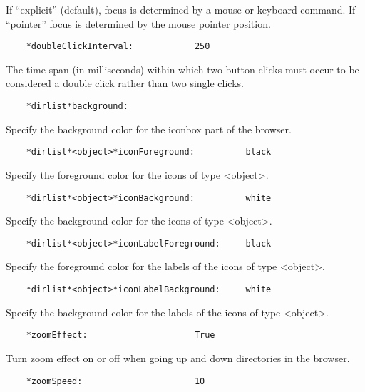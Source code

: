    If ``explicit'' (default), focus is determined by a mouse or keyboard
   command. If ``pointer'' focus is determined by the mouse pointer position.

\begin{verbatim}
    *doubleClickInterval:            250
\end{verbatim}

   The time span (in milliseconds) within which two button clicks must occur
   to be considered a double click rather than two single clicks.

\begin{verbatim}
    *dirlist*background:
\end{verbatim}

   Specify the background color for the iconbox part of the browser.

\begin{verbatim}
    *dirlist*<object>*iconForeground:          black
\end{verbatim}

   Specify the foreground color for the icons of type <object>.

\begin{verbatim}
    *dirlist*<object>*iconBackground:          white
\end{verbatim}

   Specify the background color for the icons of type <object>.

\begin{verbatim}
    *dirlist*<object>*iconLabelForeground:     black
\end{verbatim}

   Specify the foreground color for the labels of the icons of type <object>.

\begin{verbatim}
    *dirlist*<object>*iconLabelBackground:     white
\end{verbatim}

   Specify the background color for the labels of the icons of type <object>.

\begin{verbatim}
    *zoomEffect:                     True
\end{verbatim}

   Turn zoom effect on or off when going up and down directories in the
   browser.

\begin{verbatim}
    *zoomSpeed:                      10
\end{verbatim}

